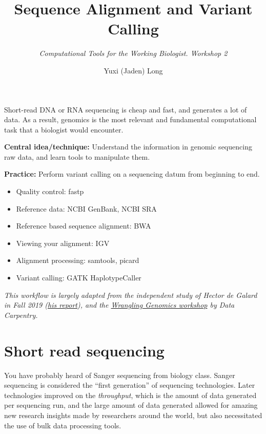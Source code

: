 \documentclass[12pt,letterpaper]{article}
\title{\textbf{Sequence Alignment and Variant Calling}}
\author{\textit{Computational Tools for the Working Biologist. Workshop 2}}
\date{Yuxi (Jaden) Long}
\begin{document}
\maketitle
\thispagestyle{empty}

\vspace{1em}

\noindent
Short-read DNA or RNA sequencing is cheap and fast, and generates a lot of data. As a result, genomics is the most relevant and fundamental computational task that a biologist would encounter.

\noindent
\textbf{Central idea/technique:} Understand the information in genomic sequencing raw data, and learn tools to manipulate them.

\textbf{Practice:} Perform variant calling on a sequencing datum from beginning to end.

\begin{itemize}
   \item Quality control: fastp
   \item Reference data: NCBI GenBank, NCBI SRA
   \item Reference based sequence alignment: BWA
   \item Viewing your alignment: IGV
   \item Alignment processing: samtools, picard
   \item Variant calling: GATK HaplotypeCaller
\end{itemize}

\textit{This workflow is largely adapted from the independent study of Hector de Galard in Fall 2019 (\href{https://github.com/longyuxi/biobyte-bioinformatics-workshop/blob/main/2/supplement/Hector_19L22.docx}{his report}), and the \href{https://www.hadriengourle.com/wrangling-genomics/01-variant_calling_workflow/}{Wrangling Genomics workshop} by Data Carpentry.}

\section{Short read sequencing}

You have probably heard of Sanger sequencing from biology class. Sanger sequencing is considered the ``first generation'' of sequencing technologies. Later technologies improved on the \textit{throughput}, which is the amount of data generated per sequencing run, and the large amount of data generated allowed for amazing new research insights made by researchers around the world, but also necessitated the use of bulk data processing tools.
\end{document}
